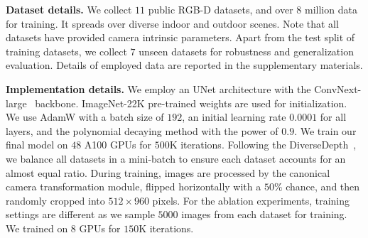 
\noindent\textbf{Dataset details.}
\label{sec:data}
We collect $11$ public RGB-D datasets, and over $8$ million data for training. It spreads over diverse indoor and outdoor scenes. Note that all datasets have provided %
camera intrinsic parameters. Apart from the test split of training datasets, we collect $7$ unseen datasets for robustness and generalization evaluation. Details of employed data are reported in the supplementary materials.  



\noindent\textbf{Implementation details.}
We employ an UNet architecture with the ConvNext-large~\cite{liu2022convnet} backbone. ImageNet-22K pre-trained weights are used for initialization. We use AdamW with a batch size of $192$, an initial learning rate $0.0001$ for all layers, and the polynomial decaying method with the power of $0.9$. We train our final model on $48$ A100 GPUs for $500$K iterations. Following the DiverseDepth~\cite{yin2021virtual}, we balance all datasets in a mini-batch to ensure each dataset accounts for an almost equal ratio. During training, images are processed by the canonical camera transformation module, flipped horizontally with a $50\%$ chance, and then randomly cropped into 
$512 \times 960$ pixels. For the ablation experiments, training settings are different as we sample $5000$ images from each dataset for training. We trained on $8$ GPUs for $150$K iterations.










